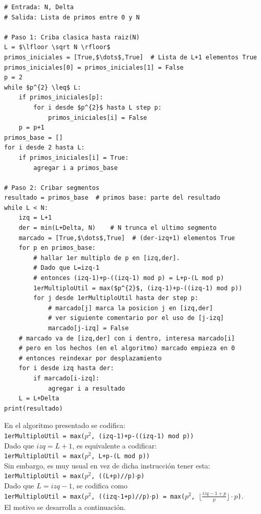 \begin{lstlisting}[caption={Criba Segmentada}, label={alg:AlgCribaSegment}, mathescape=true]
# Entrada: N, Delta
# Salida: Lista de primos entre 0 y N

# Paso 1: Criba clasica hasta raiz(N) 
L = $\lfloor \sqrt N \rfloor$
primos_iniciales = [True,$\dots$,True]  # Lista de L+1 elementos True
primos_iniciales[0] = primos_iniciales[1] = False
p = 2
while $p^{2} \leq$ L:
    if primos_iniciales[p]:
        for i desde $p^{2}$ hasta L step p:
            primos_iniciales[i] = False
    p = p+1
primos_base = []
for i desde 2 hasta L:
    if primos_iniciales[i] = True:
        agregar i a primos_base

# Paso 2: Cribar segmentos
resultado = primos_base  # primos base: parte del resultado
while L < N:
    izq = L+1
    der = min(L+Delta, N)    # N trunca el ultimo segmento
    marcado = [True,$\dots$,True]  # (der-izq+1) elementos True
    for p en primos_base:
        # hallar 1er multiplo de p en [izq,der]. 
        # Dado que L=izq-1
        # entonces (izq-1)+p-((izq-1) mod p) = L+p-(L mod p)
        1erMultiploUtil = max($p^{2}$, (izq-1)+p-((izq-1) mod p))
        for j desde 1erMultiploUtil hasta der step p:
            # marcado[j] marca la posicion j en [izq,der]
            # ver siguiente comentario por el uso de [j-izq] 
            marcado[j-izq] = False  
    # marcado va de [izq,der] con i dentro, interesa marcado[i]
    # pero en los hechos (en el algoritmo) marcado empieza en 0 
    # entonces reindexar por desplazamiento
    for i desde izq hasta der:
        if marcado[i-izq]:     
            agregar i a resultado
    L = L+Delta
print(resultado)
\end{lstlisting}

En el algoritmo presentado se codifica:\\
\texttt{1erMultiploUtil = max($p^2$, (izq-1)+p-((izq-1) mod p))}\\
Dado que $izq=L+1$, es equivalente a codificar:\\
\texttt{1erMultiploUtil = max($p^2$, L+p-(L mod p))}\\
Sin embargo, es muy usual en vez de dicha instrucción tener esta:\\
\texttt{1erMultiploUtil = max($p^2$, ((L+p)//p)$\cdot$p)}\\
Dado que $L=izq-1$, se codifica como\\
\texttt{1erMultiploUtil = max($p^2$, ((izq-1+p)//p)$\cdot$p) = max($p^2$, $\lfloor \frac{izq-1+p}{p} \rfloor \cdot p$)}.\\
El motivo se desarrolla a continuación.\\

